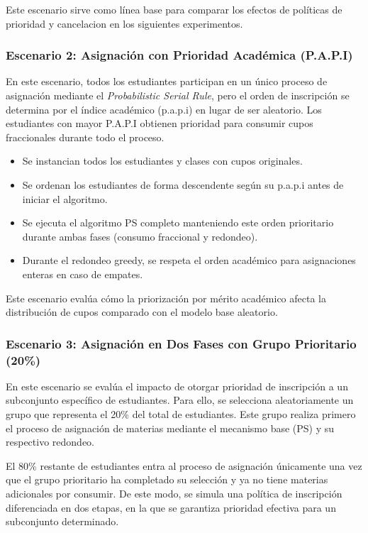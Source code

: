 \documentclass{article}
\begin{document}
Este escenario sirve como línea base para comparar los efectos de políticas de prioridad
 y cancelacion en los siguientes experimentos.

 \subsubsection{Escenario 2: Asignación con Prioridad Académica (P.A.P.I)}
 En este escenario, todos los estudiantes participan en un único proceso de asignación mediante el
  \emph{Probabilistic Serial Rule}, pero el orden de inscripción se determina por el índice académico 
  (p.a.p.i) en lugar de ser aleatorio. Los estudiantes con mayor P.A.P.I obtienen prioridad para 
  consumir cupos fraccionales durante todo el proceso.
 
 \begin{itemize}
 \item Se instancian todos los estudiantes y clases con cupos originales.
 \item Se ordenan los estudiantes de forma descendente según su p.a.p.i antes de iniciar el algoritmo.
 \item Se ejecuta el algoritmo PS completo manteniendo este orden prioritario durante ambas fases (consumo fraccional y redondeo).
 \item Durante el redondeo greedy, se respeta el orden académico para asignaciones enteras en caso de empates.
 \end{itemize}
 
 Este escenario evalúa cómo la priorización por mérito académico afecta la distribución de cupos comparado con el modelo base aleatorio.

\subsubsection{Escenario 3: Asignación en Dos Fases con Grupo Prioritario (20\%)}
En este escenario se evalúa el impacto de otorgar prioridad de inscripción a un subconjunto 
específico de estudiantes. Para ello, se selecciona aleatoriamente un grupo que representa el 
20\% del total de estudiantes. Este grupo realiza primero el proceso de asignación de materias 
mediante el mecanismo base (PS) y su respectivo redondeo.

El 80\% restante de estudiantes entra al proceso de asignación únicamente una vez que el grupo 
prioritario ha completado su selección y ya no tiene materias adicionales por consumir. 
De este modo, se simula una política de inscripción diferenciada en dos etapas, en la que se 
garantiza prioridad efectiva para un subconjunto determinado.
\end{document}
